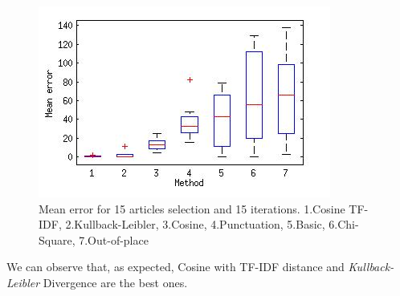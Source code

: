 \begin{figure}[H]
	\centering
	\includegraphics[scale=0.70]{Pictures/date_articles/date_corpus.jpg}
        \caption{Mean error for 15 articles selection and 15 iterations. 1.Cosine TF-IDF, 2.Kullback-Leibler, 3.Cosine, 4.Punctuation, 5.Basic, 6.Chi-Square, 7.Out-of-place}
        \label{date_cv}
\end{figure}

We can observe that, as expected, Cosine with TF-IDF distance and \emph{Kullback-Leibler} Divergence are the best ones.\\

